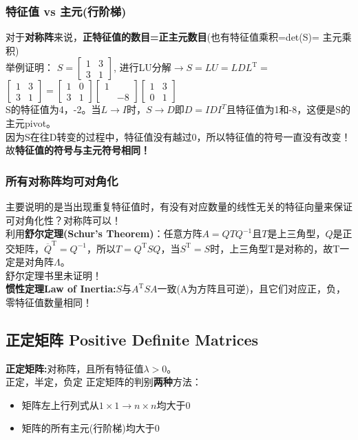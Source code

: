     \subsubsection{特征值 vs 主元(行阶梯)}
    对于\textbf{对称阵}来说，\textbf{正特征值的数目=正主元数目}(也有特征值乘积=det(S)= 主元乘积)\\
    举例证明：
    $S = \left[\begin{array}{ll}{1} & {3} \\ {3} & {1}\end{array}\right]$, 进行LU分解$\rightarrow S=LU=L D L^{\mathrm{T}}=$$\left[\begin{array}{ll}{1} & {3} \\ {3} & {1}\end{array}\right]=\left[\begin{array}{ll}{1} & {0} \\ {3} & {1}\end{array}\right]\left[\begin{array}{ll}{1} \\ {} & {-8}\end{array}\right]\left[\begin{array}{ll}{1} & {3} \\ {0} & {1}\end{array}\right]$
    \\
    S的特征值为4，-2。当$L \rightarrow I$时，$S \rightarrow D$即$D = IDI^{T}$且特征值为1和-8，这便是S的主元pivot。
    \\
    因为S在往D转变的过程中，特征值没有越过0，所以特征值的符号一直没有改变！故\textbf{特征值的符号与主元符号相同！}

    \subsubsection{所有对称阵均可对角化}
    主要说明的是当出现重复特征值时，有没有对应数量的线性无关的特征向量来保证可对角化性？对称阵可以！
    \\
    利用\textbf{舒尔定理(Schur's Theorem)}：任意方阵$A=Q T Q^{-1}$且$T$是上三角型，$Q$是正交矩阵，$\overline{Q}^{\mathrm{T}}=Q^{-1}$，所以$T=Q^{\mathrm{T}} S Q$，当$S^{\mathrm{T}}=S$时，上三角型T是对称的，故T一定是对角阵$\Lambda$。
    \\
    舒尔定理书里未证明！\\
    \textbf{惯性定理Law of Inertia:}\quad $S$与$A^{\mathrm{T}} S A$一致(A为方阵且可逆)，且它们对应正，负，零特征值数量相同！

    \subsection{正定矩阵 Positive Definite Matrices}
    \textbf{正定矩阵:}对称阵，且所有特征值$\lambda >0$。\\
    正定，半定，负定
    正定矩阵的判别\textbf{两种}方法：
    \begin{itemize}
        \item 矩阵左上行列式从$1\times 1 \rightarrow n\times n$均大于0
        \item 矩阵的所有主元(行阶梯)均大于0
    \end{itemize}
